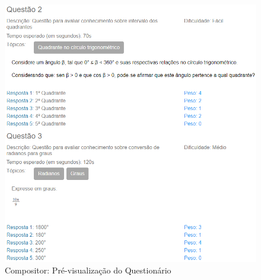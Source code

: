 \begin{figure}[htb]
	\centering
	\includegraphics[width=0.9\linewidth]{chapters/proposedMethod/compositor_questoes.png}
	\caption{Compositor: Pré-visualização do Questionário}
	\label{fig:compositor_questao}
\end{figure}




